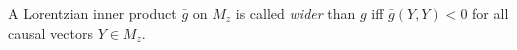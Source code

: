 A Lorentzian inner product $\bar{g}$ on $M_z$ is called \emph{wider} than $g$ iff $\bar{g}(Y,Y) < 0$ for all causal vectors $Y \in M_z$.